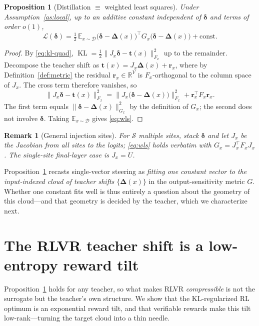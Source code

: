 \documentclass[11pt]{article}
\newtheorem{proposition}{Proposition}[section]
\newtheorem{remark}{Remark}[section]
\DeclareMathOperator{\KL}{KL}
\newcommand{\R}{\mathbb{R}}
\newcommand{\E}{\mathbb{E}}
\newcommand{\bt}{\mathbf{t}}
\newcommand{\br}{\mathbf{r}}
\newcommand{\bdelta}{\bm{\delta}}
\newcommand{\bDelta}{\bm{\Delta}}
\begin{document}
\begin{proposition}[Distillation $\equiv$ weighted least squares]\label{prop:wls}
Under Assumption~\ref{as:local}, up to an additive constant independent of $\bdelta$ and terms of
order $o(1)$,
\begin{equation}\label{eq:wls}
\mathcal L(\bdelta)
=\tfrac12\,\E_{x\sim\mathcal D}\big(\bdelta-\bDelta(x)\big)^\top G_x\big(\bdelta-\bDelta(x)\big)
 +\mathrm{const}.
\end{equation}
\end{proposition}
\begin{proof}
By \eqref{eq:kl-quad}, $\KL=\tfrac12\|J_x\bdelta-\bt(x)\|_{F_x}^2$ up to the remainder. Decompose
the teacher shift as $\bt(x)=J_x\bDelta(x)+\br_x$, where by Definition~\ref{def:metric} the residual
$\br_x\in\R^V$ is $F_x$-orthogonal to the column space of $J_x$. The cross term therefore vanishes,
so
\begin{equation*}
\|J_x\bdelta-\bt(x)\|_{F_x}^2
=\big\|J_x\big(\bdelta-\bDelta(x)\big)\big\|_{F_x}^2+\br_x^\top F_x\br_x .
\end{equation*}
The first term equals $\|\bdelta-\bDelta(x)\|_{G_x}^2$ by the definition of $G_x$; the second does
not involve $\bdelta$. Taking $\E_{x\sim\mathcal D}$ gives \eqref{eq:wls}.
\end{proof}

\begin{remark}[General injection sites]\label{rem:sites}
For $\mathcal S$ multiple sites, stack $\bdelta$ and let $J_x$ be the Jacobian from all sites to the
logits; \eqref{eq:wls} holds verbatim with $G_x=J_x^\top F_x J_x$. The single-site final-layer case
is $J_x=U$.
\end{remark}

\noindent
Proposition~\ref{prop:wls} recasts single-vector steering as \emph{fitting one constant vector to
the input-indexed cloud of teacher shifts} $\{\bDelta(x)\}$ in the output-sensitivity metric $G$.
Whether one constant fits well is thus entirely a question about the geometry of this cloud---and
that geometry is decided by the teacher, which we characterize next.

\section{The RLVR teacher shift is a low-entropy reward tilt}\label{sec:tilt}
Proposition~\ref{prop:wls} holds for any teacher, so what makes RLVR \emph{compressible} is not the
surrogate but the teacher's own structure. We show that the KL-regularized RL optimum is an
exponential reward tilt, and that verifiable rewards make this tilt low-rank---turning the target
cloud into a thin needle.
\end{document}

